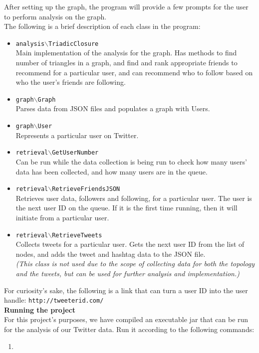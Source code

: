 \documentclass[letterpaper]{article}
\begin{document}
\noindent After setting up the graph, the program will provide a few prompts for the user to perform analysis on the graph.\\

\noindent The following is a brief description of each class in the program:
\begin{itemize}
\item \texttt{analysis$\backslash$TriadicClosure}\\
Main implementation of the analysis for the graph. Has methods to find number of triangles in a graph, and find and rank appropriate friends to recommend for a particular user, and can recommend who to follow based on who the user's friends are following. 

\item \texttt{graph$\backslash$Graph}\\
Parses data from JSON files and populates a graph with Users.

\item \texttt{graph$\backslash$User}\\
Represents a particular user on Twitter.

\item \texttt{retrieval$\backslash$GetUserNumber}\\
Can be run while the data collection is being run to check how many users' data has been collected, and how many users are in the queue.

\item \texttt{retrieval$\backslash$RetrieveFriendsJSON}\\
Retrieves user data, followers and following, for a particular user. The user is the next user ID on the queue. If it is the first time running, then it will initiate from a particular user.

\item \texttt{retrieval$\backslash$RetrieveTweets}\\
Collects tweets for a particular user. Gets the next user ID from the list of nodes, and adds the tweet and hashtag data to the JSON file.\\
\textit{(This class is not used due to the scope of collecting data for both the topology and the tweets, but can be used for further analysis and implementation.)}
\end{itemize}

For curiosity's sake, the following is a link that can turn a user ID into the user handle: \texttt{http://tweeterid.com/}\\

\noindent\textbf{Running the project}\\
For this project's purposes, we have compiled an executable jar that can be run for the analysis of our Twitter data. Run it according to the following commands:

\begin{enumerate}
\item 


\end{enumerate}
\end{document}
